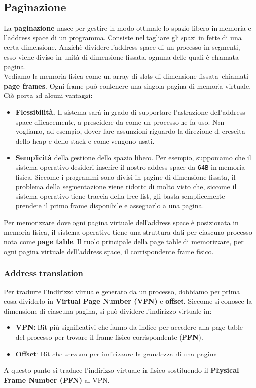 \documentclass[12pt, letterpaper]{article}
\begin{document}
		\subsection{Paginazione}
			La \textbf{paginazione} nasce per gestire in modo ottimale lo spazio libero in memoria e l'address space di un programma.
			Consiste nel tagliare gli spazi in fette di una certa dimensione. Anzichè dividere l'address space di un processo in segmenti, esso viene diviso in unità di dimensione fissata, ognuna delle quali è chiamata pagina.\\
			Vediamo la memoria fisica come un array di slots di dimensione fissata, chiamati \textbf{page frames}. Ogni frame può contenere una singola pagina di memoria virtuale. Ciò porta ad alcuni vantaggi: 
			\begin{itemize}
				\item \textbf{Flessibilità.} Il sistema sarà in grado di supportare l'astrazione dell'address space efficacemente, a prescidere da come un processo ne fa uso. Non vogliamo, ad esempio, dover fare assunzioni riguardo la direzione di crescita dello heap e dello stack e come vengono usati.
				\item \textbf{Semplicità} della gestione dello spazio libero. Per esempio, supponiamo che il sistema operativo desideri  inserire il nostro addess space da \texttt{64B} in memoria fisica. Siccome i programmi sono divisi in pagine di dimensione fissata, il problema della segmentazione viene ridotto di molto visto che, siccome il sistema operativo tiene traccia della free list, gli basta semplicemente prendere il primo frame disponibile e assegnarlo a una pagina.
			\end{itemize}
			Per memorizzare dove ogni pagina virtuale dell'address space è posizionata in memoria fisica, il sistema operativo tiene una struttura dati per  ciascuno processo nota come \textbf{page table}. Il ruolo principale della page table  di memorizzare, per ogni pagina virtuale dell'address space, il corrispondente frame fisico.	
			
			\subsubsection{Address translation}
				Per tradurre l'indirizzo virtuale generato da un processo, dobbiamo per prima cosa dividerlo in \textbf{Virtual Page Number (VPN)} e \textbf{offset}.
				Siccome si conosce la dimensione di ciascuna pagina, si può dividere l'indirizzo virtuale in:
				\begin{itemize}
					\item \textbf{VPN:} Bit più significativi che fanno da indice per accedere alla page table del processo per trovare il frame fisico corrispondente (\textbf{PFN}).
					\item \textbf{Offset:} Bit che servono per indirizzare la grandezza di una pagina.
				\end{itemize}
				A questo punto si traduce l'indirizzo virtuale in fisico sostituendo il \textbf{Physical Frame Number (PFN)} al VPN.
			
\end{document}
